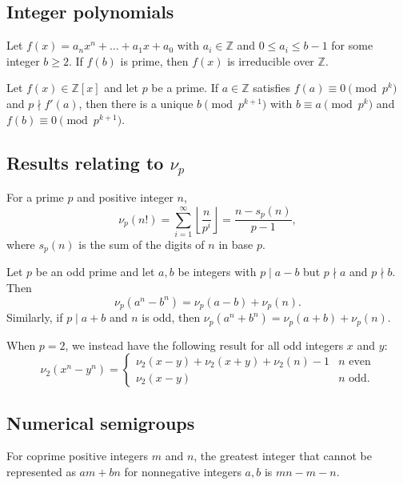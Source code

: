 \documentclass[11pt]{scrartcl}
\providecommand{\ZZ}{\mathbb Z}
\begin{document}
\subsection{Integer polynomials}
\begin{theorem}
  Let $f(x) = a_n x^n + \dots + a_1 x + a_0$ with $a_i \in \ZZ$
  and $0 \le a_i \le b - 1$ for some integer $b \ge 2$.
  If $f(b)$ is prime, then $f(x)$ is irreducible over $\ZZ$.
\end{theorem}

\begin{theorem}
  Let $f(x) \in \ZZ[x]$ and let $p$ be a prime.
  If $a \in \ZZ$ satisfies $f(a) \equiv 0 \pmod{p^k}$ and $p \nmid f'(a)$,
  then there is a unique $b \pmod{p^{k+1}}$ with $b \equiv a \pmod{p^k}$
  and $f(b) \equiv 0 \pmod{p^{k+1}}$.
\end{theorem}

\subsection{Results relating to $\nu_p$}
\begin{theorem}
  For a prime $p$ and positive integer $n$,
  \[ \nu_p(n!) = \sum_{i=1}^{\infty} \left\lfloor \frac{n}{p^i} \right\rfloor
    = \frac{n - s_p(n)}{p-1}, \]
  where $s_p(n)$ is the sum of the digits of $n$ in base $p$.
\end{theorem}

\begin{theorem}
  Let $p$ be an odd prime and let $a, b$ be integers with
  $p \mid a - b$ but $p \nmid a$ and $p \nmid b$.
  Then
  \[ \nu_p(a^n - b^n) = \nu_p(a - b) + \nu_p(n). \]
  Similarly, if $p \mid a + b$ and $n$ is odd,
  then $\nu_p(a^n + b^n) = \nu_p(a + b) + \nu_p(n)$.

  When $p=2$, we instead have the following result for all odd integers $x$ and $y$:
  \[
    \nu_2(x^n-y^n)
    = \begin{cases}
      \nu_2(x-y) + \nu_2(x+y) + \nu_2(n) - 1 & n \text{ even} \\
      \nu_2(x-y) & n \text{ odd}.
    \end{cases}
  \]
\end{theorem}

\subsection{Numerical semigroups}
\begin{theorem}
  For coprime positive integers $m$ and $n$,
  the greatest integer that cannot be represented as $am + bn$
  for nonnegative integers $a, b$ is $mn - m - n$.
\end{theorem}
\end{document}
